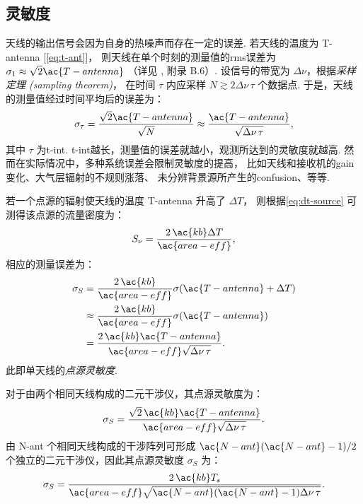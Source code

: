 \subsection{灵敏度}

天线的输出信号会因为自身的热噪声而存在一定的误差.
若天线的温度为 \ac{T-antenna} [\autoref{eq:t-ant}]，
则天线在单个时刻的测量值的\ac{rms}误差为
$\sigma_1 \approx \sqrt{2} \ac{T-antenna}$
（详见 , 附录 B.6）.
设信号的带宽为 $\Delta\nu$，根据\emph{采样定理 (sampling theorem)}，
在时间 $\tau$ 内应采样 $N \gtrsim 2 \Delta\nu \,\tau$ 个数据点.
于是，天线的测量值经过时间平均后的误差为：
\begin{equation}
  \label{eq:radiometer}
  \sigma_{\tau}
    = \frac{\sqrt{2} \ac{T-antenna}}{\sqrt{N}}
    \approx \frac{\ac{T-antenna}}{\sqrt{\Delta\nu \,\tau}} ,
\end{equation}
其中 $\tau$ 为\ac{t-int}.
\ac{t-int}越长，测量值的误差就越小，观测所达到的灵敏度就越高.
然而在实际情况中，多种系统误差会限制灵敏度的提高，
比如天线和接收机的\ac{gain}变化、大气层辐射的不规则涨落、
未分辨背景源所产生的\ac{confusion}、等等.

若一个点源的辐射使天线的温度 \ac{T-antenna} 升高了 $\Delta T$，
则根据\autoref{eq:dt-source} 可测得该点源的流量密度为：
\begin{equation}
  S_{\nu} = \frac{2\,\ac{kb} \Delta T}{\ac{area-eff}} ,
\end{equation}
相应的测量误差为：
\begin{align}
  \sigma_S
    & = \frac{2\,\ac{kb}}{\ac{area-eff}} \sigma(\ac{T-antenna} + \Delta T) \\
    & \approx \frac{2\,\ac{kb}}{\ac{area-eff}} \sigma(\ac{T-antenna}) \\
    & = \frac{2\,\ac{kb} \ac{T-antenna}}{
      \ac{area-eff} \sqrt{\Delta\nu \,\tau}} .
\end{align}
此即单天线的\emph{点源灵敏度}.

对于由两个相同天线构成的二元干涉仪，其点源灵敏度为：
\begin{equation}
  \sigma_S
    = \frac{\sqrt{2}\,\ac{kb} \ac{T-antenna}}{
        \ac{area-eff} \sqrt{\Delta\nu \,\tau}} .
\end{equation}
由 \ac{N-ant} 个相同天线构成的干涉阵列可形成 $\ac{N-ant}(\ac{N-ant}-1)/2$
个独立的二元干涉仪，因此其点源灵敏度 $\sigma_S$ 为：
\begin{equation}
  \label{eq:sigma-ps}
  \sigma_S
    = \frac{2\,\ac{kb} T_s}{
        \ac{area-eff} \sqrt{\ac{N-ant}(\ac{N-ant}-1) \Delta\nu \,\tau}} .
\end{equation}

